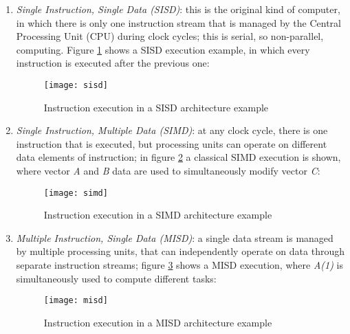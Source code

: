 \begin{enumerate}

    \item \textit{Single Instruction, Single Data (SISD)}: this is the original kind of computer, in which there is only one instruction stream that is managed by the Central Processing Unit (CPU) during clock cycles; this is serial, so non-parallel, computing. Figure \ref{fig::sisd} shows a SISD execution example, in which every instruction is executed after the previous one:
    
    \begin{figure}[H]

        \centering
        \texttt{[image: sisd]}
        \caption{Instruction execution in a SISD architecture example}
        \label{fig::sisd}
    
    \end{figure}
    
    \item \textit{Single Instruction, Multiple Data (SIMD)}: at any clock cycle, there is one instruction that is executed, but processing units can operate on different data elements of instruction; in figure \ref{fig::simd} a classical SIMD execution is shown, where vector \textit{A} and \textit{B} data are used to simultaneously modify vector \textit{C}:
    
    \begin{figure}[H]

        \centering
        \texttt{[image: simd]}
        \caption{Instruction execution in a SIMD architecture example}
        \label{fig::simd}
    
    \end{figure}
    
    \item \textit{Multiple Instruction, Single Data (MISD)}: a single data stream is managed by multiple processing units, that can independently operate on data through separate instruction streams; figure \ref{fig::misd} shows a MISD execution, where \textit{A(1)} is simultaneously used to compute different tasks:
    
    \begin{figure}[H]

        \centering
        \texttt{[image: misd]}
        \caption{Instruction execution in a MISD architecture example}
        \label{fig::misd}
    
    \end{figure}
    

\end{enumerate}
